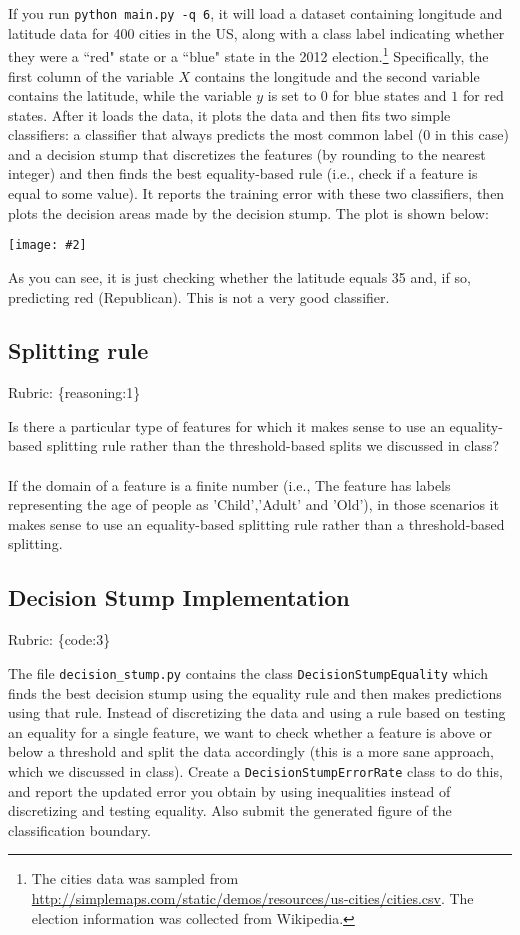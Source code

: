 \documentclass{article}
\def\rubric#1{\gre{Rubric: \{#1\}}}{}
\def\blu#1{{\color{blu}#1}}
\def\gre#1{{\color{gre}#1}}
\def\ans#1{{\color{ans}#1}}
\newcommand{\centerfig}[3]{\begin{center}\texttt{[image: \#2]}\captionof{figure}{#3}\end{center}}
\begin{document}
If you run \texttt{python main.py -q 6}, it will load a dataset containing longitude 
and latitude data for 400 cities in the US, along with a class label indicating
 whether they were a ``red" state or a ``blue" state in the 2012 
 election.\footnote{The cities data was sampled from \url{http://simplemaps.com/static/demos/resources/us-cities/cities.csv}. The election information was collected from Wikipedia.}
Specifically, the first column of the variable $X$ contains the 
longitude and the second variable contains the latitude,
while the variable $y$ is set to $0$ for blue states and $1$ for red states.
After it loads the data, it plots the data and then fits two simple 
classifiers: a classifier that always predicts the
most common label ($0$ in this case) and a decision stump
that discretizes the features (by rounding to the nearest integer)
and then finds the best equality-based rule (i.e., check
 if a feature is equal to some value).
It reports the training error with these two classifiers, then plots the decision areas made by the decision stump.
The plot is shown below:

\centerfig{0.7}{../figs/q6_decisionBoundary}{Boundary regions of \texttt{DecisionStumpEquality}}

As you can see, it is just checking whether the latitude equals 35 and, if so, predicting red (Republican).
This is not a very good classifier. 

\subsection{Splitting rule}
\rubric{reasoning:1}

Is there a particular type of features for which it makes sense to use an equality-based splitting rule rather than the threshold-based splits we discussed in class? \\
\\
\ans{If the domain of a feature is a finite number (i.e., The feature has labels representing the age of people as 'Child','Adult' and 'Old'), in those scenarios it makes sense to use an equality-based splitting rule rather than a threshold-based splitting. }

\subsection{Decision Stump Implementation}
\rubric{code:3}

The file \texttt{decision\string_stump.py} contains the class \texttt{DecisionStumpEquality} which 
finds the best decision stump using the equality rule and then makes predictions using that
rule. Instead of discretizing the data and using a rule based on testing an equality for 
a single feature, we want to check whether a feature is above or below a threshold and 
split the data accordingly (this is a more sane approach, which we discussed in class). 
\blu{Create a \texttt{DecisionStumpErrorRate} class to do this, and report the updated error you 
obtain by using inequalities instead of discretizing and testing equality. Also submit the generated figure of the classification boundary.}
\end{document}

